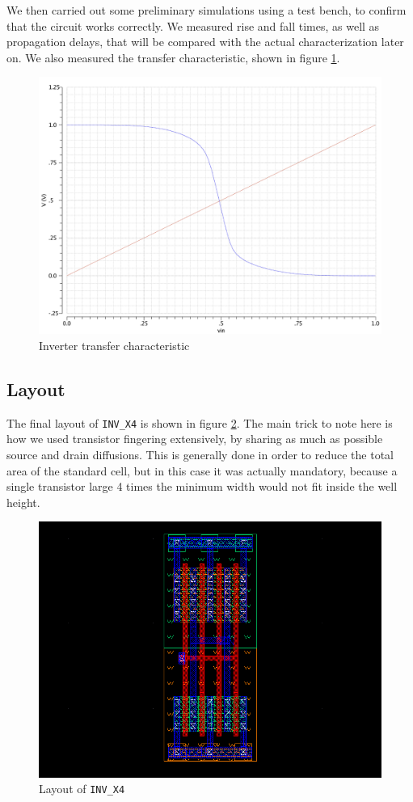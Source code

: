 \documentclass[a4paper]{article}
\newcommand{\inv}{\texttt{INV\_X4}\xspace}
\begin{document}
We then carried out some preliminary simulations using a test bench, to confirm that the circuit works correctly. We measured rise and fall times, as well as propagation delays, that will be compared with the actual characterization later on. We also measured the transfer characteristic, shown in figure \ref{fig:inv_tchar}.
\begin{figure}[H]
	\centering
	\includegraphics[width=.7\linewidth]{../INV_X4/INV_X4_transfer_char.pdf}
	\caption{Inverter transfer characteristic}
	\label{fig:inv_tchar}
\end{figure}

\subsection{Layout}
The final layout of \inv is shown in figure \ref{fig:inv_layout}. The main trick to note here is how we used transistor fingering extensively, by sharing as much as possible source and drain diffusions. This is generally done in order to reduce the total area of the standard cell, but in this case it was actually mandatory, because a single transistor large 4 times the minimum width would not fit inside the well height.
\begin{figure}[H]
	\centering
	\includegraphics[width=\linewidth]{../INV_X4/INV_X4_layout.png}
	\caption{Layout of \inv}
	\label{fig:inv_layout}
\end{figure}
\end{document}
